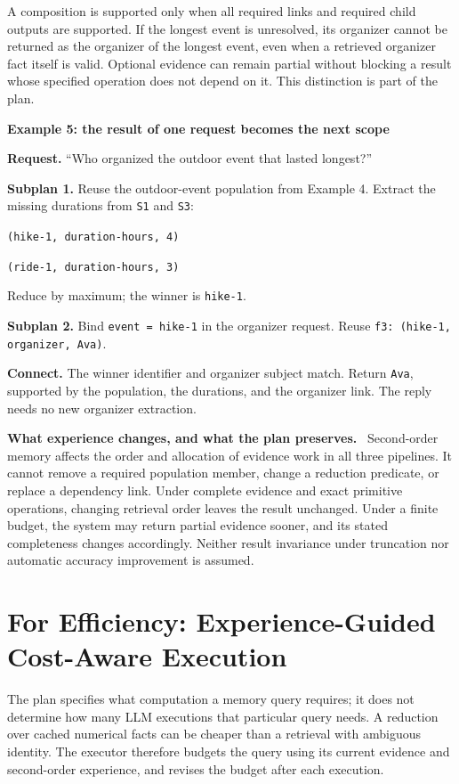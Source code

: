 \documentclass[10pt,twocolumn]{article}
\newcommand{\runin}[1]{\smallskip\noindent\textbf{#1.}\ }
\newenvironment{memoryexample}[1]{%
  \def\FrameCommand{\fboxrule=0.7pt\fboxsep=6pt\fbox}%
  \begin{framed}\small\noindent\textbf{#1}\par\smallskip
}{\end{framed}}
\begin{document}
A composition is supported only when all required links and required
child outputs are supported. If the longest event is unresolved, its
organizer cannot be returned as the organizer of the longest event,
even when a retrieved organizer fact itself is valid. Optional evidence
can remain partial without blocking a result whose specified operation
does not depend on it. This distinction is part of the plan.

\begin{memoryexample}{Example 5: the result of one request becomes the next scope}
\textbf{Request.} ``Who organized the outdoor event that lasted longest?''
\par\textbf{Subplan 1.} Reuse the outdoor-event population from Example 4.
Extract the missing durations from \texttt{S1} and \texttt{S3}:
\par\texttt{(hike-1, duration-hours, 4)}
\par\texttt{(ride-1, duration-hours, 3)}
\par Reduce by maximum; the winner is \texttt{hike-1}.
\par\textbf{Subplan 2.} Bind \texttt{event = hike-1} in the organizer
request. Reuse \texttt{f3: (hike-1, organizer, Ava)}.
\par\textbf{Connect.} The winner identifier and organizer subject match.
Return \texttt{Ava}, supported by the population, the durations, and
the organizer link. The reply needs no new organizer extraction.
\end{memoryexample}

\runin{What experience changes, and what the plan preserves}
Second-order memory affects the order and allocation of evidence work
in all three pipelines. It cannot remove a required population member,
change a reduction predicate, or replace a dependency link. Under
complete evidence and exact primitive operations, changing retrieval
order leaves the result unchanged. Under a finite budget, the system
may return partial evidence sooner, and its stated completeness changes
accordingly. Neither result invariance under truncation nor automatic
accuracy improvement is assumed.

\section{For Efficiency: Experience-Guided Cost-Aware Execution}
\label{sec:new-efficiency}

The plan specifies what computation a memory query requires; it does
not determine how many LLM executions that particular query needs.
A reduction over cached numerical facts can be cheaper than a retrieval
with ambiguous identity. The executor therefore budgets the query
using its current evidence and second-order experience, and revises
the budget after each execution.
\end{document}

